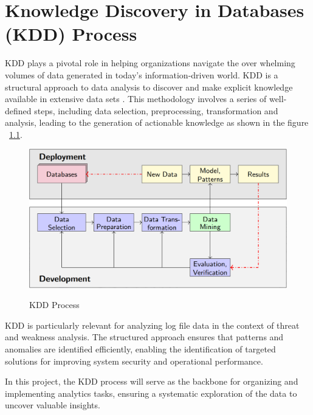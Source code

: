 %
%

\chapter{Knowledge Discovery in Databases (KDD) Process}

KDD plays a pivotal role in helping organizations navigate the over whelming volumes of data generated in today’s information-driven world. KDD is a structural approach to data analysis to discover and make explicit knowledge available in extensive data sets \cite{Wings:2024}. This methodology involves a series of well-defined steps, including data selection, preprocessing, transformation and analysis, leading to the generation of actionable knowledge as shown in the figure ~\ref{KDD Process}. \cite{KDD:2000}

\begin{figure}
	\begin{center}
		\includegraphics[width=0.7\linewidth]{Images/KDD.png}
		\caption{KDD Process}
		\label{KDD Process} 
		\cite{Wings:2024}
	\end{center}
\end{figure}

KDD is particularly relevant for analyzing log file data in the context of threat and weakness analysis. The structured approach ensures that patterns and anomalies are identified efficiently, enabling the identification of targeted solutions for improving system security and operational performance. \cite{IEEE:1997}

In this project, the KDD process will serve as the backbone for organizing and implementing analytics tasks, ensuring a systematic exploration of the data to uncover valuable insights.


